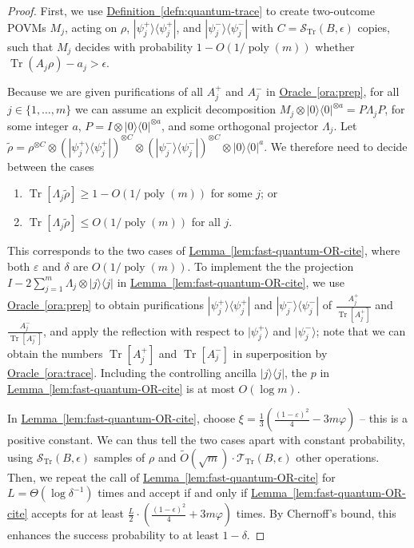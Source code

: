 \documentclass[a4paper,UKenglish,cleveref, autoref]{lipics-v2019}
\theoremstyle{remark}
\numberwithin{equation}{section}
\numberwithin{oracle}{section}
\numberwithin{remark}{section}
\newcommand{\ora}[1]{\hyperref[ora:#1]{Oracle~\ref*{ora:#1}}}
\newcommand{\defn}[1]{\hyperref[defn:#1]{Definition~\ref*{defn:#1}}}
\newcommand{\lem}[1]{\hyperref[lem:#1]{Lemma~\ref*{lem:#1}}}
\def\>{\rangle}
\def\<{\langle}
\newcommand{\ket}[1]{|#1\rangle}
\newcommand{\bra}[1]{\langle#1|}
\newcommand{\proj}[1]{\ket{#1}\bra{#1}}
\DeclareMathOperator{\poly}{poly}
\DeclareMathOperator{\tr}{Tr}
\DeclareMathOperator{\Tr}{Tr}
\begin{document}
\begin{proof}
First, we use \defn{quantum-trace} to create two-outcome POVMs $M_j$, acting on $\rho$, $|\psi_{j}^{+}\>\<\psi_{j}^{+}|$, and $|\psi_{j}^{-}\>\<\psi_{j}^{-}|$ with $C=\mathcal{S}_{\tr}(B,\epsilon)$ copies, such that $M_{j}$ decides with probability $1-O(1/\poly(m))$ whether $\tr(A_{j}\rho)-a_{j}>\epsilon$.

Because we are given purifications of all $A_{j}^{+}$ and $A_{j}^{-}$ in \ora{prep}, for all $j\in\{1,\ldots,m\}$ we can assume an explicit decomposition $M_{j} \otimes \proj{0}^{\otimes a} = P \Lambda_{j} P$, for some integer $a$, $P = I \otimes \proj{0}^{\otimes a}$, and some orthogonal projector $\Lambda_{j}$. Let $\widetilde{\rho} = \rho^{\otimes C} \otimes (|\psi_{j}^{+}\>\<\psi_{j}^{+}|)^{\otimes C} \otimes (|\psi_{j}^{-}\>\<\psi_{j}^{-}|)^{\otimes C} \otimes \proj{0}^a$. We therefore need to decide between the cases
\begin{enumerate}
\item $\Tr[\Lambda_j\widetilde{\rho}] \ge 1-O(1/\poly(m)) $ for some $j$; or
\item $\Tr[\Lambda_j\widetilde{\rho}] \le O(1/\poly(m)) $ for all $j$.
\end{enumerate}
This corresponds to the two cases of \lem{fast-quantum-OR-cite}, where both $\varepsilon$ and $\delta$ are $O(1/\poly(m))$. To implement the the projection $I-2\sum_{j = 1}^{m}\Lambda_{j}\otimes\proj{j}$ in \lem{fast-quantum-OR-cite}, we use \ora{prep} to obtain purifications $|\psi_{j}^{+}\>\<\psi_{j}^{+}|$ and $|\psi_{j}^{-}\>\<\psi_{j}^{-}|$ of $\frac{A_{j}^{+}}{\Tr[A_{j}^{+}]}$ and $\frac{A_{j}^{-}}{\Tr[A_{j}^{-}]}$, and apply the reflection with respect to $|\psi_{j}^{+}\>$ and $|\psi_{j}^{-}\>$; note that we can obtain the numbers $\Tr[A_{j}^{+}]$ and $\Tr[A_{j}^{-}]$ in superposition by \ora{trace}. Including the controlling ancilla $|j\>\<j|$, the $p$ in \lem{fast-quantum-OR-cite} is at most $O(\log m)$.

In \lem{fast-quantum-OR-cite}, choose $\xi=\frac{1}{3}(\frac{(1-\varepsilon)^{2}}{4}-3m\varphi)$ -- this is a positive constant. We can thus tell the two cases apart with constant probability, using $\mathcal{S}_{\tr}(B,\epsilon)$ samples of $\rho$ and $\tilde{O}(\sqrt{m})\cdot\mathcal{T}_{\tr}(B,\epsilon)$ other operations. Then, we repeat the call of \lem{fast-quantum-OR-cite} for $L=\Theta(\log\delta^{-1})$ times and accept if and only if \lem{fast-quantum-OR-cite} accepts for at least $\frac{L}{2}\cdot(\frac{(1-\epsilon)^{2}}{4}+3m\varphi)$ times. By Chernoff's bound, this enhances the success probability to at least $1-\delta$.


\end{proof}
\end{document}
